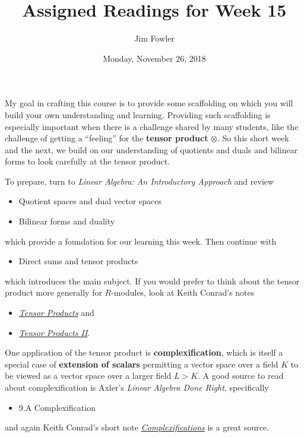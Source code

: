 \documentclass{homework}
\author{Jim Fowler}
\title{Assigned Readings for Week 15}
\date{Monday, November 26, 2018}
\begin{document}
\maketitle


My goal in crafting this course is to provide some scaffolding on
which you will build your own understanding and learning.  Providing
such scaffolding is especially important when there is a challenge
shared by many students, like the challenge of getting a ``feeling''
for the \textbf{tensor product} $\otimes$.  So this short week and the
next, we build on our understanding of quotients and duals and
bilinear forms to look carefully at the tensor product.

To prepare, turn to \textit{Linear Algebra: An Introductory Approach}
and review
\begin{itemize}
\item {} Quotient spaces and dual vector spaces
\item {} Bilinear forms and duality
\end{itemize}
which provide a foundation for our learning this week.  Then continue
with
\begin{itemize}
\item {} Direct sums and tensor products
\end{itemize}
which introduces the main subject.  If you would prefer to think about the tensor product more generally for $R$-modules, look at Keith Conrad's notes
\begin{itemize}
\item \href{http://www.math.uconn.edu/~kconrad/blurbs/linmultialg/tensorprod.pdf}{\textit{Tensor Products}} and
\item \href{http://www.math.uconn.edu/~kconrad/blurbs/linmultialg/tensorprod2.pdf}{\textit{Tensor Products II}}.
\end{itemize}

One application of the tensor product is \textbf{complexification},
which is itself a special case of \textbf{extension of scalars}
permitting a vector space over a field $K$ to be viewed as a vector
space over a larger field $L > K$.  A good source to read about
complexification is Axler's \textit{Linear Algebra Done Right},
specifically
\begin{itemize}
\item \textsection 9.A Complexification
\end{itemize}
and again Keith Conrad's short note \href{http://www.math.uconn.edu/~kconrad/blurbs/linmultialg/complexification.pdf}{\textit{Complexifications}} is a great source.
\end{document}
